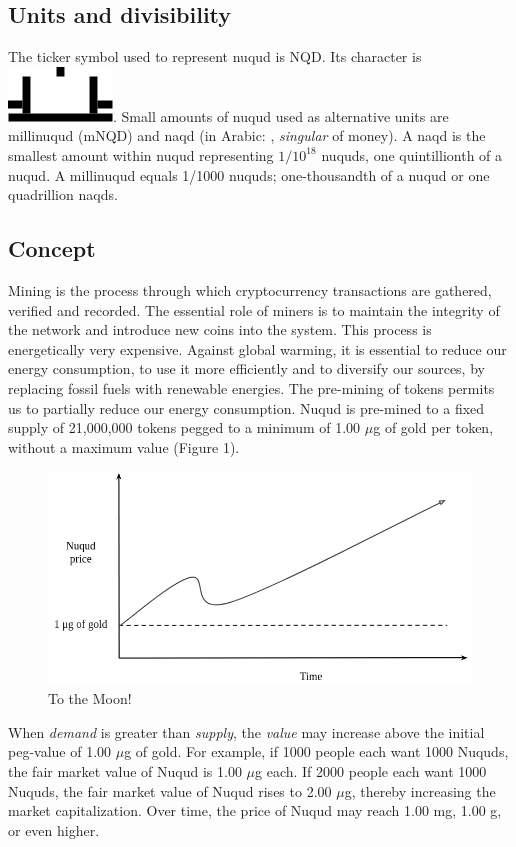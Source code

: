 \documentclass[12pt]{article}
\begin{document}
\subsection{Units and divisibility}
The ticker symbol used to represent nuqud is NQD. Its character is  {\includegraphics[width=.03\linewidth]{n.png}}. Small amounts of nuqud used as alternative units are millinuqud (mNQD) and naqd (in Arabic: \foreignlanguage{arabic}{}, \emph{singular} of money). A naqd is the smallest amount within nuqud representing $1/10^{18}$ nuquds, one quintillionth of a nuqud. A millinuqud equals 1/1000 nuquds; one-thousandth of a nuqud or one quadrillion naqds.

\subsection{Concept}
Mining is the process through which cryptocurrency transactions are gathered, verified and recorded. The essential role of miners is to maintain the integrity of the network and introduce new coins into the system. This process is energetically very expensive. Against global warming, it is essential to reduce our energy consumption, to use it more efficiently and to diversify our sources, by replacing fossil fuels with renewable energies. The pre-mining of tokens permits us to partially reduce our energy consumption. Nuqud is pre-mined to a fixed supply of 21,000,000 tokens pegged to a minimum of  1.00 $\mu$g of gold per token, without a maximum value (Figure 1).
\begin{figure}[!h]
  \centering
  \includegraphics[width=.78\linewidth]{figure1}
  \caption{To the Moon!}
  \label{fig:f1}
\end{figure}

When \emph{demand} is greater than \emph{supply}, the \emph{value} may increase above the initial peg-value of 1.00 $\mu$g of gold.  For example, if 1000 people each want 1000 Nuquds, the fair market value of Nuqud is 1.00 $\mu$g each. If 2000 people each want 1000 Nuquds, the fair market value of Nuqud rises to 2.00 $\mu$g, thereby increasing the market capitalization. Over time, the price of Nuqud may reach 1.00 mg, 1.00 g, or even higher.
\end{document}
